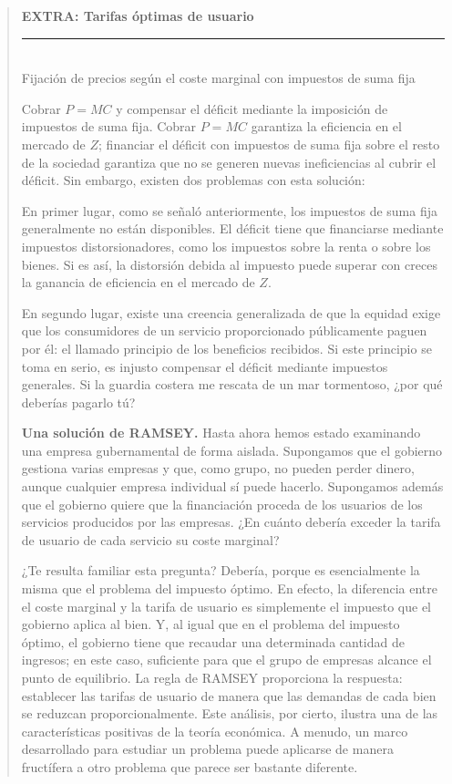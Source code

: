 \documentclass[10pt,a4paper]{article}
\newenvironment{specialblock}[1]{%
      \begin{quote} %
      \small %
      \noindent\textbf{#1}\\[-0.3em] %
      \rule{\linewidth}{0.4pt}\\[0.6em]}{
      \end{quote}}
\begin{document}
\begin{specialblock}{\textbf{EXTRA: Tarifas óptimas de usuario}}
    Fijación de precios según el coste marginal con impuestos de suma fija
    
    Cobrar $P = MC$ y compensar el déficit mediante la imposición de impuestos de suma fija. Cobrar $P = MC$ garantiza la eficiencia en el mercado de $Z$; financiar el déficit con impuestos de suma fija sobre el resto de la sociedad garantiza que no se generen nuevas ineficiencias al cubrir el déficit. Sin embargo, existen dos problemas con esta solución:
    
    En primer lugar, como se señaló anteriormente, los impuestos de suma fija generalmente no están disponibles. El déficit tiene que financiarse mediante impuestos distorsionadores, como los impuestos sobre la renta o sobre los bienes. Si es así, la distorsión debida al impuesto puede superar con creces la ganancia de eficiencia en el mercado de $Z$.
    
    En segundo lugar, existe una creencia generalizada de que la equidad exige que los consumidores de un servicio proporcionado públicamente paguen por él: el llamado principio de los beneficios recibidos. Si este principio se toma en serio, es injusto compensar el déficit mediante impuestos generales. Si la guardia costera me rescata de un mar tormentoso, ¿por qué deberías pagarlo tú?
    
    \textbf{Una solución de RAMSEY.} Hasta ahora hemos estado examinando una empresa gubernamental de forma aislada. Supongamos que el gobierno gestiona varias empresas y que, como grupo, no pueden perder dinero, aunque cualquier empresa individual sí puede hacerlo. Supongamos además que el gobierno quiere que la financiación proceda de los usuarios de los servicios producidos por las empresas. ¿En cuánto debería exceder la tarifa de usuario de cada servicio su coste marginal?
    
    ¿Te resulta familiar esta pregunta? Debería, porque es esencialmente la misma que el problema del impuesto óptimo. En efecto, la diferencia entre el coste marginal y la tarifa de usuario es simplemente el impuesto que el gobierno aplica al bien. Y, al igual que en el problema del impuesto óptimo, el gobierno tiene que recaudar una determinada cantidad de ingresos; en este caso, suficiente para que el grupo de empresas alcance el punto de equilibrio. La regla de RAMSEY proporciona la respuesta: establecer las tarifas de usuario de manera que las demandas de cada bien se reduzcan proporcionalmente. Este análisis, por cierto, ilustra una de las características positivas de la teoría económica. A menudo, un marco desarrollado para estudiar un problema puede aplicarse de manera fructífera a otro problema que parece ser bastante diferente.
    

\end{specialblock}
\end{document}
